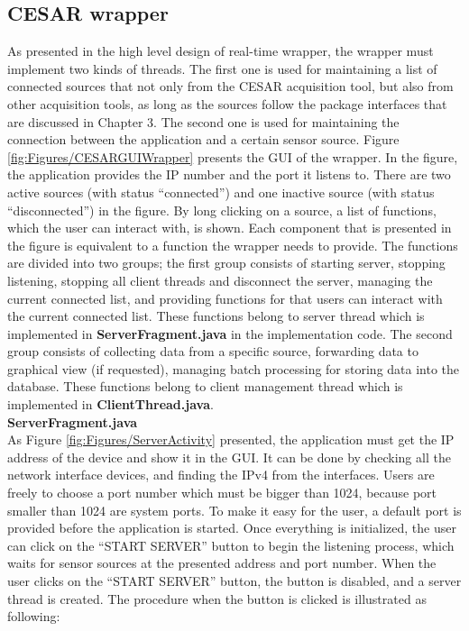 \subsection{CESAR wrapper}
As presented in the high level design of real-time wrapper, the wrapper must implement two kinds of threads. The first one is used for maintaining a list of connected sources that not only from the CESAR acquisition tool, but also from other acquisition tools, as long as the sources follow the package interfaces that are discussed in Chapter 3. The second one is used for maintaining the connection between the application and a certain sensor source. Figure \ref{fig:Figures/CESARGUIWrapper} presents the GUI of the wrapper. 
In the figure, the application provides the IP number and the port it listens to. There are two active sources (with status “connected”) and one inactive source (with status “disconnected”) in the figure. By long clicking on a source, a list of functions, which the user can interact with, is shown. Each component that is presented in the figure is equivalent to a function the wrapper needs to provide. The functions are divided into two groups; the first group consists of starting server, stopping listening, stopping all client threads and disconnect the server, managing the current connected list, and providing functions for that users can interact with the current connected list. These functions belong to server thread which is implemented in \textbf{ServerFragment.java} in the implementation code. The second group consists of collecting data from a specific source, forwarding data to graphical view (if requested), managing batch processing for storing data into the database. These functions belong to client management thread which is implemented in \textbf{ClientThread.java}.\\
\textbf{ServerFragment.java}\\
As Figure \ref{fig:Figures/ServerActivity} presented, the application must get the IP address of the device and show it in the GUI. It can be done by checking all the network interface devices, and finding the IPv4 from the interfaces. Users are freely to choose a port number which must be bigger than 1024, because port smaller than 1024 are system ports\citep{IANAPORT}. To make it easy for the user, a default port is provided before the application is started. Once everything is initialized, the user can click on the “START SERVER” button to begin the listening process, which waits for sensor sources at the presented address and port number. When the user clicks on the “START SERVER” button, the button is disabled, and a server thread is created. The procedure when the button is clicked is illustrated as following:
